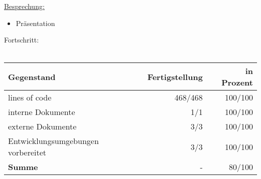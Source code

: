 \documentclass[12pt]{article}
\begin{document}
\uline{Besprechung:}
\begin{itemize}\itemsep0em
\item Präsentation
\end{itemize}

Fortschritt:\\\\
\begin{tabularx}{\textwidth}{|X|r|r|} \hline
\textbf{Gegenstand}&\textbf{Fertigstellung} & \textbf{in Prozent}\\ \hline
lines of code & 468/468  & 100/100\\ \hline
interne Dokumente & 1/1 & 100/100  \\ \hline
externe Dokumente & 3/3 & 100/100 \\ \hline
Entwicklungsumgebungen vorbereitet & 3/3 & 100/100 \\ \hline
\textbf{Summe} & - & 80/100  \\ \hline
\end{tabularx}\\\\


\clearpage
\end{document}
